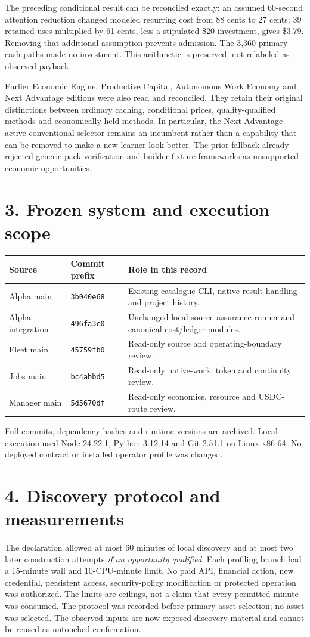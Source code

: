 \documentclass[11pt,letterpaper]{article}
\newcommand{\code}[1]{{\small\nolinkurl{#1}}}
\newcommand{\sect}[1]{\section*{#1}}
\begin{document}
The preceding conditional result can be reconciled exactly: an assumed 60-second attention reduction changed modeled recurring cost from 88 cents to 27 cents; 39 retained uses multiplied by 61 cents, less a stipulated \$20 investment, gives \$3.79. Removing that additional assumption prevents admission. The 3,360 primary cash paths made no investment. This arithmetic is preserved, not relabeled as observed payback.

Earlier Economic Engine, Productive Capital, Autonomous Work Economy and Next Advantage editions were also read and reconciled. They retain their original distinctions between ordinary caching, conditional prices, quality-qualified methods and economically held methods. In particular, the Next Advantage active conventional selector remains an incumbent rather than a capability that can be removed to make a new learner look better. The prior fallback already rejected generic pack-verification and builder-fixture frameworks as unsupported economic opportunities.\cite{earlier}

\sect{3. Frozen system and execution scope}
\begin{tabularx}{\linewidth}{@{}p{.27\linewidth}p{.18\linewidth}Y@{}}
\toprule
\textbf{Source} & \textbf{Commit prefix} & \textbf{Role in this record}\\
\midrule
Alpha main & \code{3b040e68} & Existing catalogue CLI, native result handling and project history.\\
Alpha integration & \code{496fa3c0} & Unchanged local source-assurance runner and canonical cost/ledger modules.\\
Fleet main & \code{45759fb0} & Read-only source and operating-boundary review.\\
Jobs main & \code{bc4abbd5} & Read-only native-work, token and continuity review.\\
Manager main & \code{5d5670df} & Read-only economics, resource and USDC-route review.\\
\bottomrule
\end{tabularx}
Full commits, dependency hashes and runtime versions are archived. Local execution used Node 24.22.1, Python 3.12.14 and Git 2.51.1 on Linux x86-64. No deployed contract or installed operator profile was changed.\cite{sources}

\sect{4. Discovery protocol and measurements}
The declaration allowed at most 60 minutes of local discovery and at most two later construction attempts \emph{if an opportunity qualified}. Each profiling branch had a 15-minute wall and 10-CPU-minute limit. No paid API, financial action, new credential, persistent access, security-policy modification or protected operation was authorized. The limits are ceilings, not a claim that every permitted minute was consumed. The protocol was recorded before primary asset selection; no asset was selected. The observed inputs are now exposed discovery material and cannot be reused as untouched confirmation.
\end{document}
